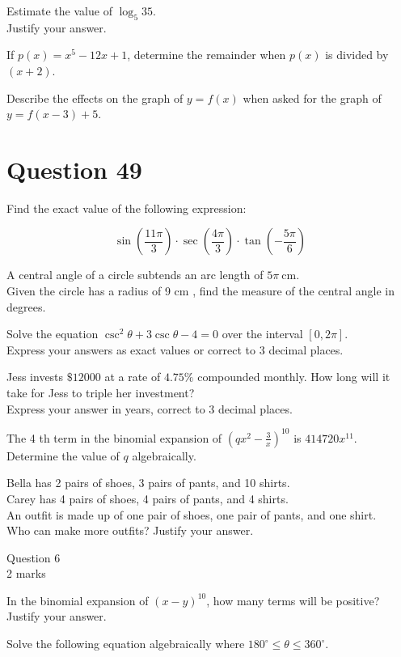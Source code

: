 \documentclass[10pt]{article}
\begin{document}
Estimate the value of $\log _{5} 35$.\\
Justify your answer.

If $p(x)=x^{5}-12 x+1$, determine the remainder when $p(x)$ is divided by $(x+2)$.

Describe the effects on the graph of $y=f(x)$ when asked for the graph of $y=f(x-3)+5$.

\section*{Question 49}
Find the exact value of the following expression:

$$
\sin \left(\frac{11 \pi}{3}\right) \cdot \sec \left(\frac{4 \pi}{3}\right) \cdot \tan \left(-\frac{5 \pi}{6}\right)
$$

A central angle of a circle subtends an arc length of $5 \pi \mathrm{~cm}$.\\
Given the circle has a radius of 9 cm , find the measure of the central angle in degrees.

Solve the equation $\csc ^{2} \theta+3 \csc \theta-4=0$ over the interval $[0,2 \pi]$.\\
Express your answers as exact values or correct to 3 decimal places.

Jess invests $\$ 12000$ at a rate of $4.75 \%$ compounded monthly. How long will it take for Jess to triple her investment?\\
Express your answer in years, correct to 3 decimal places.

The 4 th term in the binomial expansion of $\left(q x^{2}-\frac{3}{x}\right)^{10}$ is $414720 x^{11}$.\\
Determine the value of $q$ algebraically.

Bella has 2 pairs of shoes, 3 pairs of pants, and 10 shirts.\\
Carey has 4 pairs of shoes, 4 pairs of pants, and 4 shirts.\\
An outfit is made up of one pair of shoes, one pair of pants, and one shirt.\\
Who can make more outfits? Justify your answer.

Question 6\\
2 marks

In the binomial expansion of $(x-y)^{10}$, how many terms will be positive?\\
Justify your answer.

Solve the following equation algebraically where $180^{\circ} \leq \theta \leq 360^{\circ}$.
\end{document}

